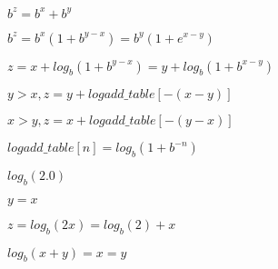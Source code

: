 \documentclass{article}
\begin{document}
$ b^z = b^x + b^y $
\pagebreak

$ b^z = b^x(1 + b^{y-x}) = b^y(1 + e^{x-y}) $
\pagebreak

$ z = x + log_b(1 + b^{y-x}) = y + log_b(1 + b^{x-y}) $
\pagebreak

$ y > x, z = y + logadd\_table[-(x-y)] $
\pagebreak

$ x > y, z = x + logadd\_table[-(y-x)] $
\pagebreak

$ logadd\_table[n] = log_b(1 + b^{-n}) $
\pagebreak

$ log_b(2.0) $
\pagebreak

$ y = x $
\pagebreak

$ z = log_b(2x) = log_b(2) + x $
\pagebreak

$ log_b(x+y) = x = y $
\pagebreak
\end{document}
